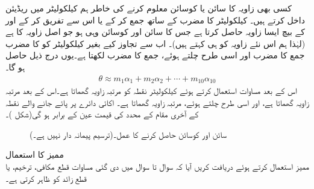 کسی بھی زاویہ  کا سائن یا کوسائن معلوم کرنے کی خاطر ہم کیلکولیٹر میں  ریڈیئن داخل کرتے ہیں۔ کیلکولیٹر  کا  مضرب  کے ساتھ جمع کر کے یا اس سے تفریق کر کے   اور  کے بیچ  ایسا زاویہ حاصل کرتا ہے جس کا سائن اور کوسائن وہی ہو جو اصل زاویہ  کا ہے (لہٰذا ہم اس نئے زاویہ کو  ہی کہتے ہیں)۔ اب  سے تجاوز کیے بغیر کیلکولیٹر  کو  کا مضرب جمع  کا مضرب اور اسی طرح چلتے ہوئے، جمع   کا مضرب  لکھتا ہے۔یوں درج ذیل حاصل ہو گا۔
\begin{align*}
\theta\approx m_1\alpha_1+m_2\alpha_2+\cdots+m_{10}\alpha_{10}
\end{align*}
اس کے بعد مساوات   استعمال کرتے ہوئے کیلکولیٹر نقطہ  کو   مرتبہ   زاویہ گھماتا ہے۔اس کے بعد    مرتبہ   زاویہ گھماتا ہے، اور اسی طرح چلتے ہوئے،   مرتبہ   زاویہ گھماتا ہے۔ اکائی دائرے پر پائے جانے والے نقطہ   کے آخری مقام کے محدد کی قیمت عین    کے برابر ہو گی(شکل )۔

\begin{figure}
\centering
{}
\caption{سائن اور کوسائن حاصل کرنے کا عمل۔(ترسیم پیمانہ دار  نہیں ہے۔)}
\label{شکل_مخروط_کیلکولیٹر_سائن_کوسائن}
\end{figure}

{ممیز کا استعمال}\\
ممیز   استعمال کرتے ہوئے دریافت کریں آیا کہ  سوال  تا سوال  میں دی گئی مساوات قطع مکافی، ترخیم،  یا قطع زائد کو ظاہر کرتی ہے۔

